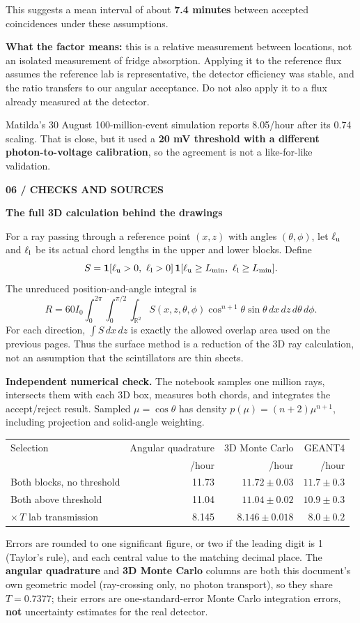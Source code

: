 \documentclass[11pt,a4paper]{article}
\newcommand{\pageheading}[2]{{\color{teal}\small\bfseries #1}\par
{\color{ink}\LARGE\bfseries #2}\par\vspace{5pt}}
\newcommand{\note}[1]{\par\noindent\colorbox{pale}{\parbox{\dimexpr\linewidth-2\fboxsep\relax}{\vspace{4pt}#1\vspace{4pt}}}\par}
\begin{document}
This suggests a mean interval of about \textbf{7.4 minutes} between accepted
coincidences under these assumptions.

\note{\textbf{What the factor means:} this is a relative measurement between
locations, not an isolated measurement of fridge absorption. Applying it to
the reference flux assumes the reference lab is representative, the detector
efficiency was stable, and the ratio transfers to our angular acceptance.
Do not also apply it to a flux already measured at the detector.}

Matilda's 30 August 100-million-event simulation reports 8.05/hour after its
0.74 scaling. That is close, but it used a \textbf{20 mV threshold with a different
photon-to-voltage calibration}, so the agreement is not a like-for-like validation.

\newpage
\pageheading{06 / CHECKS AND SOURCES}{The full 3D calculation behind the drawings}
For a ray passing through a reference point $(x,z)$ with angles $(\theta,\phi)$,
let $\ell_{\rm u}$ and $\ell_{\rm l}$ be its actual chord lengths in the upper
and lower blocks. Define
\[
S=\mathbf{1}[\ell_{\rm u}>0,\ \ell_{\rm l}>0]\,
  \mathbf{1}[\ell_{\rm u}\ge L_{\min},\ \ell_{\rm l}\ge L_{\min}].
\]
The unreduced position-and-angle integral is
\[
R=60I_0\int_0^{2\pi}\int_0^{\pi/2}\int_{\mathbb{R}^2}
 S(x,z,\theta,\phi)\cos^{n+1}\theta\sin\theta\,
 dx\,dz\,d\theta\,d\phi.
\]
For each direction, $\int S\,dx\,dz$ is exactly the allowed overlap area used
on the previous pages. Thus the surface method is a reduction of the 3D
ray calculation, not an assumption that the scintillators are thin sheets.

\textbf{Independent numerical check.} The notebook samples one million rays,
intersects them with each 3D box, measures both chords, and integrates the
accept/reject result. Sampled $\mu=\cos\theta$ has density
$p(\mu)=(n+2)\mu^{n+1}$, including projection and solid-angle weighting.
\begin{center}
\begin{tabular}{lrrr}
\toprule
Selection & Angular quadrature & 3D Monte Carlo & GEANT4 \\
 & /hour & /hour & /hour \\
\midrule
Both blocks, no threshold & 11.73 & $11.72\pm0.03$ & $11.7\pm0.3$ \\
Both above threshold & 11.04 & $11.04\pm0.02$ & $10.9\pm0.3$ \\
$\times\,T$ lab transmission & 8.145 & $8.146\pm0.018$ & $8.0\pm0.2$ \\
\bottomrule
\end{tabular}
\end{center}
Errors are rounded to one significant figure, or two if the leading digit is 1
(Taylor's rule), and each central value to the matching decimal place. The
\textbf{angular quadrature} and \textbf{3D Monte Carlo} columns are both this
document's own geometric model (ray-crossing only, no photon transport), so
they share $T=0.7377$; their errors are one-standard-error Monte Carlo
integration errors, \textbf{not} uncertainty estimates for the real detector.
\end{document}
